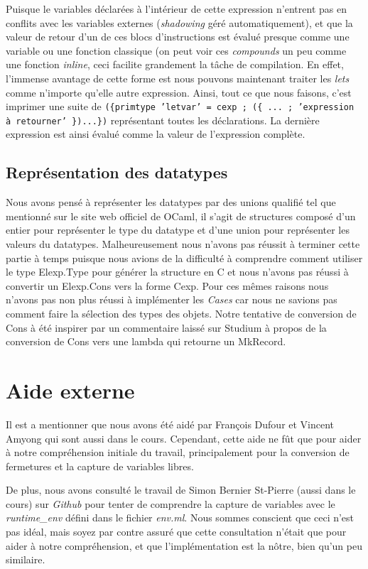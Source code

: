\documentclass{article}
\begin{document}
Puisque le variables déclarées à l'intérieur de cette expression n'entrent
pas en conflits avec les variables externes (\emph{shadowing} géré
automatiquement), et que la valeur de retour d'un de ces blocs d'instructions
est évalué presque comme une variable ou une fonction
classique (on peut voir ces \emph{compounds} un peu comme une fonction 
\emph{inline}, ceci facilite grandement la tâche de compilation. En effet,
l'immense avantage de cette forme est nous pouvons maintenant traiter les
\emph{lets} comme n'importe qu'elle autre expression. Ainsi, tout ce que
nous faisons, c'est imprimer une suite de
\texttt{(\{primtype 'letvar' = cexp ; (\{ ... ;
  'expression à retourner' \})...\})}
représentant toutes les déclarations. La dernière expression est ainsi évalué
comme la valeur de l'expression complète.


\subsection{Représentation des datatypes}
Nous avons pensé à représenter les datatypes par des unions qualifié tel que
mentionné sur le site web officiel de OCaml, il s'agit de structures composé
d'un entier pour représenter le type du datatype et d'une union pour
représenter les valeurs du datatypes. Malheureusement nous n'avons pas réussit
à terminer cette partie à temps puisque nous avions de la difficulté à
comprendre comment utiliser le type Elexp.Type pour générer la structure en
C et nous n'avons pas réussi à convertir un Elexp.Cons vers la forme Cexp.
Pour ces mêmes raisons nous n'avons pas non plus réussi à implémenter les
\emph{Cases} car nous ne savions pas comment faire la sélection des types
des objets. Notre tentative de conversion de Cons à été inspirer par un
commentaire laissé sur Studium à propos de la conversion de Cons vers
une lambda qui retourne un MkRecord.

\section{Aide externe}
Il est a mentionner que nous avons été aidé par François Dufour et Vincent
Amyong qui sont aussi dans le cours. Cependant, cette aide ne fût que pour aider
à notre compréhension initiale du travail, principalement pour la conversion de
fermetures et la capture de variables libres.

De plus, nous avons consulté le travail de Simon Bernier St-Pierre (aussi dans
le cours) sur \emph{Github} \cite{sbstp} pour tenter de comprendre la capture de
variables avec le \emph{runtime\_env} défini dans le fichier \emph{env.ml}.
Nous sommes conscient que ceci n'est pas idéal, mais soyez par contre assuré
que cette consultation n'était que pour aider à notre compréhension, et que
l'implémentation est la nôtre, bien qu'un peu similaire.
 
\end{document}
